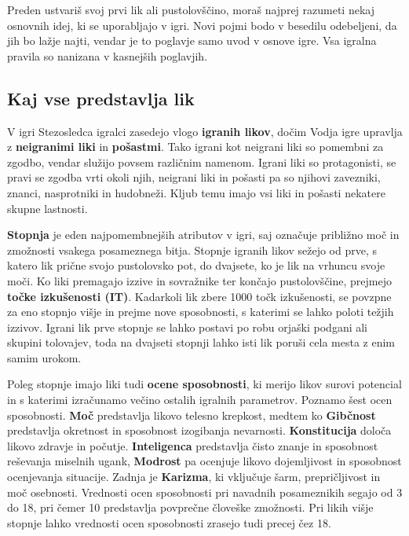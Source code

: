 Preden ustvariš svoj prvi lik ali pustolovščino, moraš najprej razumeti nekaj osnovnih idej, ki se uporabljajo v igri. Novi pojmi bodo v besedilu odebeljeni, da jih bo lažje najti, vendar je to poglavje samo uvod v osnove igre. Vsa igralna pravila so nanizana v kasnejših poglavjih.

\subsection{Kaj vse predstavlja lik}

V igri Stezosledca igralci zasedejo vlogo \textbf{igranih likov}, dočim Vodja igre upravlja z \textbf{neigranimi liki} in \textbf{pošastmi}. Tako igrani kot neigrani liki so pomembni za zgodbo, vendar služijo povsem različnim namenom. Igrani liki so protagonisti, se pravi se zgodba vrti okoli njih, neigrani liki in pošasti pa so njihovi zavezniki, znanci, nasprotniki in hudobneži. Kljub temu imajo vsi liki in pošasti nekatere skupne lastnosti.

\textbf{Stopnja} je eden najpomembnejših atributov v igri, saj označuje približno moč in zmožnosti vsakega posameznega bitja. Stopnje igranih likov sežejo od prve, s katero lik prične svojo pustolovsko pot, do dvajsete, ko je lik na vrhuncu svoje moči. Ko liki premagajo izzive in sovražnike ter končajo pustolovščine, prejmejo \textbf{točke izkušenosti (IT)}. Kadarkoli lik zbere 1000 točk izkušenosti, se povzpne za eno stopnjo višje in prejme nove sposobnosti, s katerimi se lahko poloti težjih izzivov. Igrani lik prve stopnje se lahko postavi po robu orjaški podgani ali skupini tolovajev, toda na dvajseti stopnji lahko isti lik poruši cela mesta z enim samim urokom.

Poleg stopnje imajo liki tudi \textbf{ocene sposobnosti}, ki merijo likov surovi potencial in s katerimi izračunamo večino ostalih igralnih parametrov. Poznamo šest ocen sposobnosti. \textbf{Moč} predstavlja likovo telesno krepkost, medtem ko \textbf{Gibčnost} predstavlja okretnost in sposobnost izogibanja nevarnosti. \textbf{Konstitucija} določa likovo zdravje in počutje. \textbf{Inteligenca} predstavlja čisto znanje in sposobnost reševanja miselnih ugank, \textbf{Modrost} pa ocenjuje likovo dojemljivost in sposobnost ocenjevanja situacije. Zadnja je \textbf{Karizma}, ki vključuje šarm, prepričljivost in moč osebnosti. Vrednosti ocen sposobnosti pri navadnih posameznikih segajo od 3 do 18, pri čemer 10 predstavlja povprečne človeške zmožnosti. Pri likih višje stopnje lahko vrednosti ocen sposobnosti zrasejo tudi precej čez 18.

